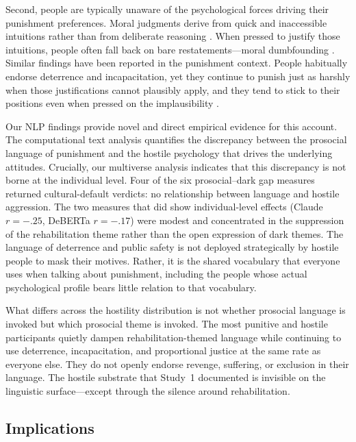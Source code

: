 Second, people are typically unaware of the psychological forces driving their punishment preferences. Moral judgments derive from quick and inaccessible intuitions rather than from deliberate reasoning \citep{Haidt2001}. When pressed to justify those intuitions, people often fall back on bare restatements---moral dumbfounding \citep[][p.~817]{Haidt2001}. Similar findings have been reported in the punishment context. People habitually endorse deterrence and incapacitation, yet they continue to punish just as harshly when those justifications cannot plausibly apply, and they tend to stick to their positions even when pressed on the implausibility \citep{AharoniFridlund2012, Carlsmith2008, CarlsmithDarley2008, CarlsmithEtAl2002}.

Our NLP findings provide novel and direct empirical evidence for this account. The computational text analysis quantifies the discrepancy between the prosocial language of punishment and the hostile psychology that drives the underlying attitudes. Crucially, our multiverse analysis indicates that this discrepancy is not borne at the individual level. Four of the six prosocial--dark gap measures returned cultural-default verdicts: no relationship between language and hostile aggression. The two measures that did show individual-level effects (Claude $r = -.25$, DeBERTa $r = -.17$) were modest and concentrated in the suppression of the rehabilitation theme rather than the open expression of dark themes. The language of deterrence and public safety is not deployed strategically by hostile people to mask their motives. Rather, it is the shared vocabulary that everyone uses when talking about punishment, including the people whose actual psychological profile bears little relation to that vocabulary.

What differs across the hostility distribution is not whether prosocial language is invoked but which prosocial theme is invoked. The most punitive and hostile participants quietly dampen rehabilitation-themed language while continuing to use deterrence, incapacitation, and proportional justice at the same rate as everyone else. They do not openly endorse revenge, suffering, or exclusion in their language. The hostile substrate that Study~1 documented is invisible on the linguistic surface---except through the silence around rehabilitation.

\subsection{Implications}

